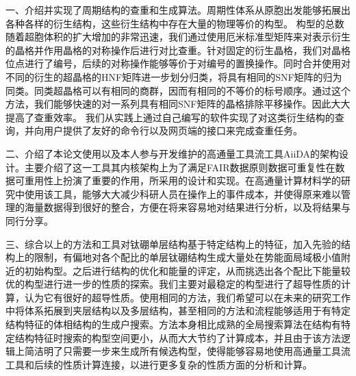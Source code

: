 \documentclass[phd,nobackinfo]{scutthesis}
\begin{document}
一、介绍并实现了周期结构的查重和生成算法。周期性体系从原胞出发能够拓展出各种各样的衍生结构，这些衍生结构中存在大量的物理等价的构型。
构型的总数随着超胞体积的扩大增加的非常迅速，我们通过使用厄米标准型矩阵来对表示衍生的晶格并作用晶格的对称操作后进行对比查重。针对固定的衍生晶格，我们对晶格位点进行了编号，后续的对称操作能够等价于对编号的置换操作。同时合并使用对不同的衍生的超晶格的HNF矩阵进一步划分归类，将具有相同的SNF矩阵的归为同类。同类超晶格可以有相同的商群，因而有相同的不等价的标号顺序。通过这个方法，我们能够快速的对一系列具有相同SNF矩阵的晶格排除平移操作。因此大大提高了查重效率。
我们从实践上通过自己编写的软件实现了对这类衍生结构的查询，并向用户提供了友好的命令行以及网页端的接口来完成查重任务。

二、介绍了本论文使用以及本人参与开发维护的高通量工具流工具AiiDA的架构设计。主要介绍了这一工具其内核架构上为了满足FAIR数据原则数据可重复性在数据可重用性上扮演了重要的作用，所采用的设计和实现。在高通量计算材料学的研究中使用该工具，能够大大减少科研人员在操作上的事件成本，并使得原来难以管理的海量数据得到很好的整合，方便在将来容易地对结果进行分析，以及将结果与同行分享。

三、综合以上的方法和工具对钛硼单层结构基于特定结构上的特征，加入先验的结构上的限制，有偏地对各个配比的单层钛硼结构生成大量处在势能面局域极小值附近的初始构型。之后进行结构的优化和能量的评定，从而挑选出各个配比下能量较优的构型进行进一步的性质的探索。我们主要对最稳定的构型进行了超导性质的计算，认为它有很好的超导性质。使用相同的方法，我们希望可以在未来的研究工作中将体系拓展到夹层结构以及多层结构，甚至相同的方法和流程能够适用于有特定结构特征的体相结构的生成户搜索。方法本身相比成熟的全局搜索算法在结构有特定结构特征时搜索的构型空间更小，从而大大节约了计算成本，并且由于该方法逻辑上简洁明了只需要一步来生成所有候选构型，使得能够容易地使用高通量工具流工具和后续的性质计算连接，以进行更多复杂的性质方面的分析和计算。
\end{document}
